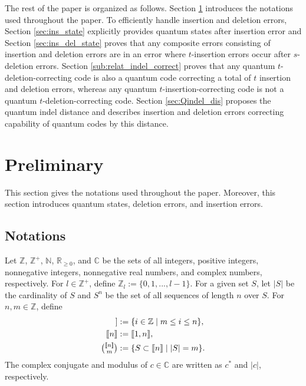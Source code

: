 \documentclass[reprint,amsmath,amssymb,aps,]{revtex4-2}
\theoremstyle{definition}
\newcommand{\SET}[1]{\mathbb{#1}}
\newcommand{\NNR}{\SET{R}_{\ge 0}}
\newcommand{\Z}{\SET{Z}}
\newcommand{\N}{\SET{N}}
\newcommand{\C}{\SET{C}}
\newcommand{\1}{\mbox{1}\hspace{-0.25em}\mbox{l}}%
\newcommand{\setint}[1]{[\hspace{-0.5mm}[#1]\hspace{-0.5mm}]}
\newcommand{\subint}[2]{\tbinom{\setint{#1}}{#2}}
\begin{document}
The rest of the paper is organized as follows.
Section \ref{sec:pre} introduces the notations used throughout the paper.
To efficiently handle insertion and deletion errors,
Section \ref{sec:ins_state} explicitly provides
quantum states after insertion error
and
Section \ref{sec:ins_del_state}
proves that
any composite errors consisting of insertion and deletion errors
are in
an error where $t$-insertion errors occur after $s$-deletion errors.
Section \ref{sub:relat_indel_correct} proves that
any quantum $t$-deletion-correcting code
is also
a quantum code correcting
a total of $t$ insertion and deletion errors,
whereas
any quantum $t$-insertion-correcting code
is not
a quantum $t$-deletion-correcting code.
Section \ref{sec:Qindel_dis} proposes the quantum indel distance and
describes insertion and deletion errors correcting capability of quantum codes
by this distance. 

\section{Preliminary}
\label{sec:pre}
This section gives the notations used throughout the paper.
Moreover,
this section introduces
quantum states, deletion errors, and insertion errors.

\subsection{Notations}
Let $\Z$, $\Z^+$, $\N$, $\NNR$, and $\C$ be
the sets of all integers, positive integers, nonnegative integers,
nonnegative real numbers, and complex numbers, respectively.
For $l \in \Z^+$,
define $\Z_l := \{ 0,1,...,l-1 \}$.
For a given set $S$,
let $|S|$ be the cardinality of $S$
and
$S^n$ be the set of all sequences of length $n$ over $S$.
For $n, m \in \mathbb{Z}$,
define
\begin{align*}
  \setint{m,n}
  &:=
  \{ i \in \Z \mid m \leq i \leq n \},\\
  \setint{n}
  &:=
  \setint{1,n},\\
  \subint{n}{m}
  &:=
  \{ S \subset \setint{n} \mid |S|=m \}.
\end{align*}
The complex conjugate and modulus of $c \in \C$ are written as $c^*$ and $|c|$,
respectively.
\end{document}
